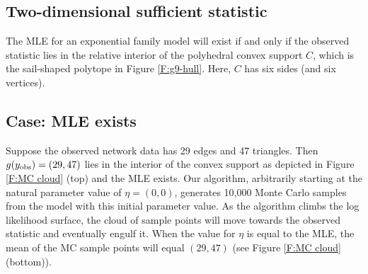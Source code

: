 \subsection{Two-dimensional sufficient statistic}\label{S:example 2dim}
The MLE for an exponential family model will exist if and only if the observed 
statistic lies in the relative interior of the polyhedral convex support $C$, which 
is the sail-shaped polytope in Figure \ref{F:g9-hull}. Here, $C$ has six 
sides (and six vertices).

\subsection{Case: MLE exists}
Suppose the observed network data has 29 edges and 47 triangles.  Then $g(y_{\text{obs}}) = (29,47)$
lies in the interior of the convex support as depicted in Figure \ref{F:MC cloud} 
(top) and the MLE exists.
Our algorithm, arbitrarily starting at the natural parameter value of $\eta = (0,0)$, 
generates 10,000 Monte Carlo samples from the model with this initial parameter value.  As 
the algorithm climbs the log likelihood surface, 
the cloud of sample points will move towards 
the observed statistic and eventually engulf it.  
When the value for $\eta$ is equal to the MLE, the mean of the MC sample points will 
equal $(29,47)$ (see Figure \ref{F:MC cloud} (bottom)).  

